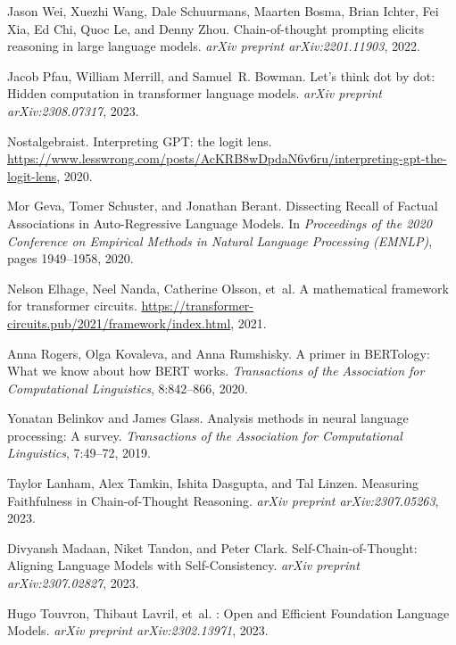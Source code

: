 \documentclass{article}
\begin{document}
\begin{thebibliography}{9}

Jason Wei, Xuezhi Wang, Dale Schuurmans, Maarten Bosma, Brian Ichter, Fei Xia, Ed Chi, Quoc Le, and Denny Zhou.
\newblock Chain-of-thought prompting elicits reasoning in large language models.
\newblock \emph{arXiv preprint arXiv:2201.11903}, 2022.

Jacob Pfau, William Merrill, and Samuel~R. Bowman.
\newblock Let's think dot by dot: Hidden computation in transformer language models.
\newblock \emph{arXiv preprint arXiv:2308.07317}, 2023.

Nostalgebraist.
\newblock Interpreting {GPT}: the logit lens.
\newblock \url{https://www.lesswrong.com/posts/AcKRB8wDpdaN6v6ru/interpreting-gpt-the-logit-lens}, 2020.

Mor Geva, Tomer Schuster, and Jonathan Berant.
\newblock Dissecting {Recall} of {Factual} {Associations} in {Auto}-{Regressive} {Language} {Models}.
\newblock In \emph{Proceedings of the 2020 Conference on Empirical Methods in Natural Language Processing (EMNLP)}, pages 1949--1958, 2020.

Nelson Elhage, Neel Nanda, Catherine Olsson, et~al.
\newblock A mathematical framework for transformer circuits.
\newblock \url{https://transformer-circuits.pub/2021/framework/index.html}, 2021.

Anna Rogers, Olga Kovaleva, and Anna Rumshisky.
\newblock A primer in {BERTology}: What we know about how {BERT} works.
\newblock \emph{Transactions of the Association for Computational Linguistics}, 8:842--866, 2020.

Yonatan Belinkov and James Glass.
\newblock Analysis methods in neural language processing: A survey.
\newblock \emph{Transactions of the Association for Computational Linguistics}, 7:49--72, 2019.

Taylor Lanham, Alex Tamkin, Ishita Dasgupta, and Tal Linzen.
\newblock Measuring {Faithfulness} in {Chain}-of-{Thought} {Reasoning}.
\newblock \emph{arXiv preprint arXiv:2307.05263}, 2023.

Divyansh Madaan, Niket Tandon, and Peter Clark.
\newblock Self-{Chain}-of-{Thought}: {Aligning} {Language} {Models} with {Self}-Consistency.
\newblock \emph{arXiv preprint arXiv:2307.02827}, 2023.

Hugo Touvron, Thibaut Lavril, et~al.
: Open and {Efficient} {Foundation} {Language} {Models}.
\newblock \emph{arXiv preprint arXiv:2302.13971}, 2023.

\end{thebibliography}
\end{document}
